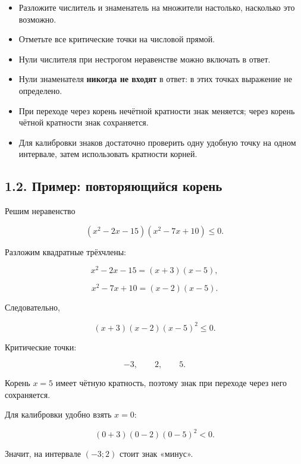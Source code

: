 \documentclass[a4paper,12pt]{article}
\newcommand{\checkitem}{\item[$\square$]}
\newcommand{\important}[1]{\textcolor{darkaccent}{\textbf{#1}}}
\begin{document}
\begin{itemize}

\checkitem
Разложите числитель и знаменатель на множители настолько,
насколько это возможно.

\checkitem
Отметьте все критические точки на числовой прямой.

\checkitem
Нули числителя при нестрогом неравенстве можно включать в ответ.

\checkitem
Нули знаменателя \important{никогда не входят} в ответ:
в этих точках выражение не определено.

\checkitem
При переходе через корень нечётной кратности знак меняется;
через корень чётной кратности знак сохраняется.

\checkitem
Для калибровки знаков достаточно проверить одну удобную точку
на одном интервале, затем использовать кратности корней.

\end{itemize}

\subsection*{1.2. Пример: повторяющийся корень}

Решим неравенство

\[
(x^2-2x-15)(x^2-7x+10)\le 0.
\]

Разложим квадратные трёхчлены:

\[
x^2-2x-15=(x+3)(x-5),
\]

\[
x^2-7x+10=(x-2)(x-5).
\]

Следовательно,

\[
(x+3)(x-2)(x-5)^2\le0.
\]

Критические точки:

\[
-3,\qquad 2,\qquad 5.
\]

Корень \(x=5\) имеет чётную кратность, поэтому знак
при переходе через него сохраняется.

Для калибровки удобно взять \(x=0\):

\[
(0+3)(0-2)(0-5)^2<0.
\]

Значит, на интервале \((-3;2)\) стоит знак «минус».

\begin{center}
\end{center}
\end{document}
